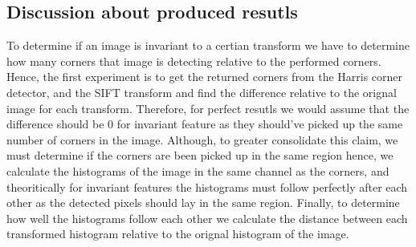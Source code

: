 \documentclass[conference]{IEEEtran}
\begin{document}
\subsection{Discussion about produced resutls}
To determine if an image is invariant to a certian transform we have to determine how many corners that image is detecting relative to the performed corners. Hence, the first experiment is to get the returned corners from the Harris corner detector, and the SIFT transform and find the difference relative to the orignal image for each transform. Therefore, for perfect resutls we would assume that the difference should be 0 for invariant feature as they should've picked up the same number of corners in the image. Although, to greater consolidate this claim, we must determine if the corners are been picked up in the same region hence, we calculate the histograms of the image in the same channel as the corners, and theoritically for invariant features the histograms must follow perfectly after each other as the detected pixels should lay in the same region. Finally, to determine how well the histograms follow each other we calculate the distance between each transformed histogram relative to the orignal histogram of the image.\par
\end{document}
